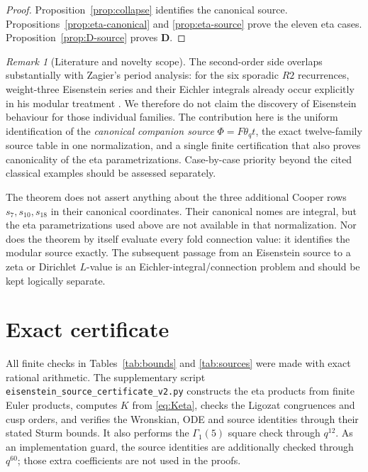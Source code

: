 \documentclass[11pt]{article}
\theoremstyle{remark}
\newtheorem{remark}[theorem]{Remark}
\begin{document}
\begin{proof}
Proposition~\ref{prop:collapse} identifies the canonical source.
Propositions~\ref{prop:eta-canonical} and \ref{prop:eta-source} prove the
eleven eta cases.  Proposition~\ref{prop:D-source} proves $\mathbf D$.
\end{proof}

\begin{remark}[Literature and novelty scope]\label{rem:novelty}
The second-order side overlaps substantially with Zagier's period analysis:
for the six sporadic $R2$ recurrences, weight-three Eisenstein series and their
Eichler integrals already occur explicitly in his modular treatment
\cite{Zagier}.  We therefore do not claim the discovery of Eisenstein
behaviour for those individual families.  The contribution here is the
uniform identification of the \emph{canonical companion source}
$\Phi=F\theta_qt$, the exact twelve-family source table in one normalization,
and a single finite certification that also proves canonicality of the eta
parametrizations.  Case-by-case priority beyond the cited classical examples
should be assessed separately.
\end{remark}

The theorem does not assert anything about the three additional Cooper rows
$s_7,s_{10},s_{18}$ in their canonical coordinates.  Their canonical nomes
are integral, but the eta parametrizations used above are not available in
that normalization.  Nor does the theorem by itself evaluate every fold
connection value: it identifies the modular source exactly.  The subsequent
passage from an Eisenstein source to a zeta or Dirichlet $L$-value is an
Eichler-integral/connection problem and should be kept logically separate.

\section{Exact certificate}

All finite checks in Tables~\ref{tab:bounds} and \ref{tab:sources} were made
with exact rational arithmetic.  The supplementary script
\texttt{eisenstein\_source\_certificate\_v2.py} constructs the eta products
from finite Euler products, computes $K$ from \eqref{eq:Keta}, checks the
Ligozat congruences and cusp orders, and verifies the Wronskian, ODE and source
identities through their stated Sturm bounds.  It also performs the
$\Gamma_1(5)$ square check through $q^{12}$.  As an implementation guard, the
source identities are additionally checked through $q^{60}$; those extra
coefficients are not used in the proofs.
\end{document}

